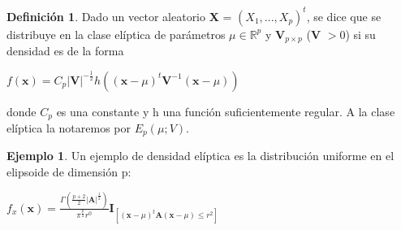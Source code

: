 \documentclass{article}
\theoremstyle{theorem-style}  %
\theoremstyle{definition}
\newtheorem{definition}{Definición}[section]
\theoremstyle{example-style}
\newtheorem{example}{Ejemplo}[section]
\begin{document}
	\begin{definition}
		Dado un vector aleatorio \textbf{X} = $(X_1, ..., X_p)^t$, se dice que se distribuye en la clase elíptica de parámetros $\mu \in \mathbb{R}^p$ y \textbf{V}$_{p \times p}$ (\textbf{V} $> 0$) si su densidad es de la forma
		
		\begin{center}
		\begin{math}
			f(\textbf{x}) = C_p|\textbf{V}|^{-\frac{1}{2}}h((\textbf{x}-\mu)^t\textbf{V}^{-1}(\textbf{x}-\mu))
		\end{math}
		\end{center}
		donde $C_p$ es una constante y h una función suficientemente regular. A la clase elíptica la notaremos por $E_p(\mu; V)$.
	\end{definition}

	\begin{example}
		Un ejemplo de densidad elíptica es la distribución uniforme en el elipsoide de dimensión p:
		
		\begin{center}
			\begin{math}
				f_x(\textbf{x}) = \frac{\Gamma(\frac{p+2}{2}|\textbf{A}|^\frac{1}{2})}{\pi^\frac{p}{2}r^0}\textbf{I}_{[(\textbf{x}-\mu)^t\textbf{A}(\textbf{x}-\mu)\leq r^2]}
			\end{math}
		\end{center}

	\end{example}
\end{document}
